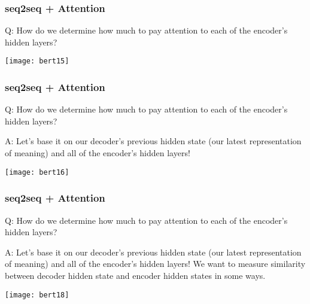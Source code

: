 \begin{frame}[fragile]\frametitle{seq2seq + Attention}

Q: How do we determine how much to pay attention to each of the encoder’s hidden layers? 

\begin{center}
\texttt{[image: bert15]}
\end{center}	

\end{frame}


\begin{frame}[fragile]\frametitle{seq2seq + Attention}

Q: How do we determine how much to pay attention to each of the encoder’s hidden layers? 

A: Let’s base it on our decoder’s previous hidden state (our latest representation of meaning) and all of the encoder’s hidden layers!


\begin{center}
\texttt{[image: bert16]}
\end{center}	

\end{frame}







\begin{frame}[fragile]\frametitle{seq2seq + Attention}

Q: How do we determine how much to pay attention to each of the encoder’s hidden layers? 

A: Let’s base it on our decoder’s previous hidden state (our latest representation of meaning) and all of the encoder’s hidden layers! We want to measure similarity between decoder hidden state and encoder hidden states in some ways. 



\begin{center}
\texttt{[image: bert18]}
\end{center}	

\end{frame}

